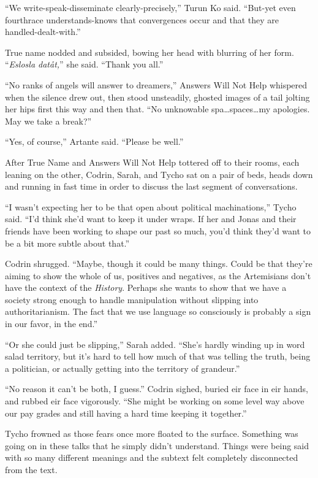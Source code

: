 ``We write-speak-disseminate clearly-precisely,'' Turun Ko said. ``But-yet even fourthrace understands-knows that convergences occur and that they are handled-dealt-with.''

True name nodded and subsided, bowing her head with blurring of her form. ``\emph{Eslosla datåt,}'' she said. ``Thank you all.''

``No ranks of angels will answer to dreamers,'' Answers Will Not Help whispered when the silence drew out, then stood unsteadily, ghosted images of a tail jolting her hips first this way and then that. ``No unknowable spa\ldots spaces\ldots my apologies. May we take a break?''

``Yes, of course,'' Artante said. ``Please be well.''

After True Name and Answers Will Not Help tottered off to their rooms, each leaning on the other, Codrin, Sarah, and Tycho sat on a pair of beds, heads down and running in fast time in order to discuss the last segment of conversations.

``I wasn't expecting her to be that open about political machinations,'' Tycho said. ``I'd think she'd want to keep it under wraps. If her and Jonas and their friends have been working to shape our past so much, you'd think they'd want to be a bit more subtle about that.''

Codrin shrugged. ``Maybe, though it could be many things. Could be that they're aiming to show the whole of us, positives and negatives, as the Artemisians don't have the context of the \emph{History}. Perhaps she wants to show that we have a society strong enough to handle manipulation without slipping into authoritarianism. The fact that we use language so consciously is probably a sign in our favor, in the end.''

``Or she could just be slipping,'' Sarah added. ``She's hardly winding up in word salad territory, but it's hard to tell how much of that was telling the truth, being a politician, or actually getting into the territory of grandeur.''

``No reason it can't be both, I guess.'' Codrin sighed, buried eir face in eir hands, and rubbed eir face vigorously. ``She might be working on some level way above our pay grades and still having a hard time keeping it together.''

Tycho frowned as those fears once more floated to the surface. Something was going on in these talks that he simply didn't understand. Things were being said with so many different meanings and the subtext felt completely disconnected from the text.

